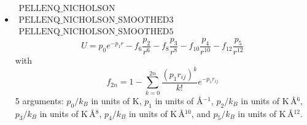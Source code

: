 \begin{itemize}
\item{$\begin{array}{l}\text{PELLENQ\_NICHOLSON}\\
      \text{PELLENQ\_NICHOLSON\_SMOOTHED3}\\
      \text{PELLENQ\_NICHOLSON\_SMOOTHED5}\end{array}$}\\
  \begin{equation}
    U= p_0 e^{-p_1 r}-f_6 \frac{p_2}{r^6}-f_8\frac{p_3}{r^8}-f_{10}\frac{p_4}{r^{10}}-f_{12}\frac{p_5}{r^{12}}
  \end{equation}
  with
  \begin{equation}
   f_{2n}=1-\sum_{k=0}^{2n}\frac{\left(p_1 r_{ij}\right)^k}{k!} e^{-p_1 r_{ij}}
  \end{equation}
  5 arguments: $p_0/k_B$ in units of K, $p_1$ in units of \AA$^{-1}$, $p_2/k_B$ in units of K\,\AA$^{6}$,
  $p_3/k_B$ in units of K\,\AA$^{8}$, $p_4/k_B$ in units of K\,\AA$^{10}$, and $p_5/k_B$ in units of K\,\AA$^{12}$.


\end{itemize}
